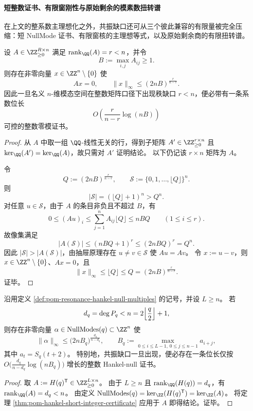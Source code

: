 \paragraph{短整数证书、有限窗刚性与原始剩余的模素数扭转谱}
在上文的整系数主理想化之外，共振缺口还可从三个彼此兼容的有限量被完全压缩：短 NullMode 证书、有限窗核的主理想等式，以及原始剩余商的有限扭转谱。

\begin{theorem}\label{thm:pom-hankel-short-integer-certificate}
设 \(A\in\ZZ_{\ge 0}^{R\times n}\) 满足
\(
\operatorname{rank}_{\QQ}(A)=r<n
\)，并令
\[
B:=\max_{i,j}A_{ij}\ge 1.
\]
则存在非零向量 \(x\in\ZZ^n\setminus\{0\}\) 使
\[
Ax=0,
\qquad
\|x\|_\infty\le (2nB)^{\frac{r}{n-r}}.
\]
因此一旦名义 \(n\)-维模态空间在整数矩阵口径下出现秩缺口 \(r<n\)，便必带有一条系数位长
\[
O\!\left(\frac{r}{n-r}\log(nB)\right)
\]
可控的整数零模证书。
\end{theorem}
\begin{proof}
从 \(A\) 中取一组 \(\QQ\)-线性无关的行，得到子矩阵
\(
A'\in \ZZ_{\ge 0}^{r\times n}
\)
且 \(\ker_{\QQ}(A')=\ker_{\QQ}(A)\)，故只需对 \(A'\) 证明结论。
以下仍记该 \(r\times n\) 矩阵为 \(A\)。

令
\[
Q:=(2nB)^{\frac{r}{n-r}},
\qquad
\mathcal S:=\{0,1,\dots,\lfloor Q\rfloor\}^{n}.
\]
则
\[
|\mathcal S|=(\lfloor Q\rfloor+1)^n>Q^n.
\]
对任意 \(u\in\mathcal S\)，由于 \(A\) 的条目非负且不超过 \(B\)，有
\[
0\le (Au)_i\le \sum_{j=1}^{n}A_{ij}\lfloor Q\rfloor\le nBQ
\qquad(1\le i\le r).
\]
故像集满足
\[
|A(\mathcal S)|\le (nBQ+1)^r\le (2nBQ)^r=Q^n.
\]
因此 \(|\mathcal S|>|A(\mathcal S)|\)，由抽屉原理存在 \(u\neq v\in\mathcal S\) 使 \(Au=Av\)。
令 \(x:=u-v\)，则 \(x\in\ZZ^n\setminus\{0\}\)、\(Ax=0\)，且
\[
\|x\|_\infty\le \lfloor Q\rfloor\le Q=(2nB)^{\frac{r}{n-r}}.
\]
证毕。
\end{proof}

\begin{corollary}\label{cor:pom-resonance-short-nullmode-certificate}
沿用定义 \ref{def:pom-resonance-hankel-null-multiples} 的记号，并设 \(L\ge n\)。
若
\[
d_q=\deg P_q<n=2\Bigl\lfloor\frac q2\Bigr\rfloor+1,
\]
则存在非零向量 \(\alpha\in \mathrm{NullModes}(q)\subset\ZZ^n\) 使
\[
\|\alpha\|_\infty
\le
\bigl(2nB_q\bigr)^{\frac{d_q}{n-d_q}},
\qquad
B_q:=\max_{0\le i\le L-1,\ 0\le j\le n-1}a_{i+j},
\]
其中 \(a_t=S_q(t+2)\)。
特别地，共振缺口一旦出现，便必存在一条位长仅按
\(
O\!\bigl(\frac{d_q}{n-d_q}\log(nB_q)\bigr)
\)
增长的整数 Hankel-null 证书。
\end{corollary}
\begin{proof}
取 \(A:=H(q)^{\mathsf T}\in\ZZ_{\ge 0}^{L\times n}\)。
由于 \(L\ge n\) 且 \(\operatorname{rank}_{\QQ}(H(q))=d_q\)，有
\(
\operatorname{rank}_{\QQ}(A)=d_q<n
\)。
由定义 \(\mathrm{NullModes}(q)=\ker_{\ZZ}(H(q)^{\mathsf T})=\ker_{\ZZ}(A)\)。
将定理 \ref{thm:pom-hankel-short-integer-certificate} 应用于 \(A\) 即得结论。证毕。
\end{proof}

